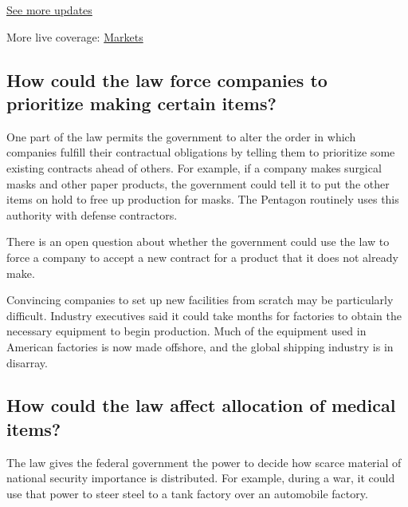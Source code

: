\href{https://www.nytimes3xbfgragh.onion/2020/09/09/world/covid-19-coronavirus.html?action=click\&pgtype=Article\&state=default\&region=MAIN_CONTENT_1\&context=storylines_live_updates}{See
more updates}

More live coverage:
\href{https://www.nytimes3xbfgragh.onion/live/2020/09/09/business/stock-market-today-coronavirus?action=click\&pgtype=Article\&state=default\&region=MAIN_CONTENT_1\&context=storylines_live_updates}{Markets}

\hypertarget{how-could-the-law-force-companies-to-prioritize-making-certain-items}{%
\subsection{How could the law force companies to prioritize making
certain
items?}\label{how-could-the-law-force-companies-to-prioritize-making-certain-items}}

One part of the law permits the government to alter the order in which
companies fulfill their contractual obligations by telling them to
prioritize some existing contracts ahead of others. For example, if a
company makes surgical masks and other paper products, the government
could tell it to put the other items on hold to free up production for
masks. The Pentagon routinely uses this authority with defense
contractors.

There is an open question about whether the government could use the law
to force a company to accept a new contract for a product that it does
not already make.

Convincing companies to set up new facilities from scratch may be
particularly difficult. Industry executives said it could take months
for factories to obtain the necessary equipment to begin production.
Much of the equipment used in American factories is now made offshore,
and the global shipping industry is in disarray.

\hypertarget{how-could-the-law-affect-allocation-of-medical-items}{%
\subsection{How could the law affect allocation of medical
items?}\label{how-could-the-law-affect-allocation-of-medical-items}}

The law gives the federal government the power to decide how scarce
material of national security importance is distributed. For example,
during a war, it could use that power to steer steel to a tank factory
over an automobile factory.

